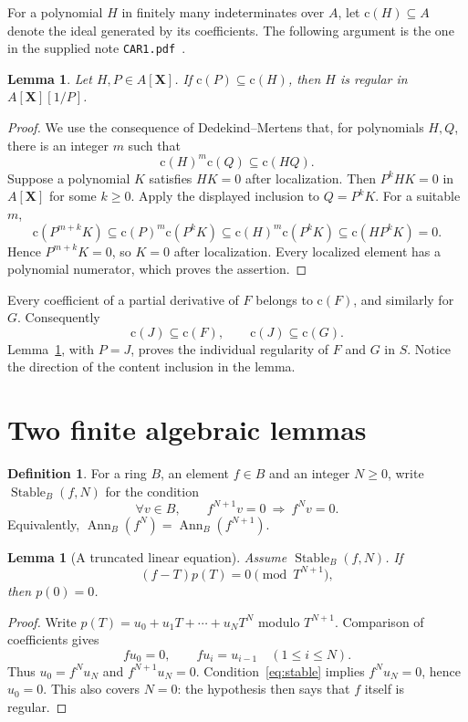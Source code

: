 \documentclass[11pt]{amsart}
\newtheorem{lemma}[theorem]{Lemma}
\theoremstyle{definition}
\newtheorem{definition}[theorem]{Definition}
\theoremstyle{remark}
\DeclareMathOperator{\Ann}{Ann}
\newcommand{\content}{\mathrm{c}}
\newcommand{\code}[1]{\texttt{#1}}
\begin{document}
For a polynomial $H$ in finitely many indeterminates over $A$, let
$\content(H)\subseteq A$ denote the ideal generated by its coefficients.
The following argument is the one in the supplied note
\code{CAR1.pdf}~\cite{CAR1}.

\begin{lemma}\label{lem:content}
Let $H,P\in A[\mathbf X]$. If
$\content(P)\subseteq\content(H)$, then $H$ is regular in
$A[\mathbf X][1/P]$.
\end{lemma}
\begin{proof}
We use the consequence of Dedekind--Mertens that, for polynomials
$H,Q$, there is an integer $m$ such that
\[
 \content(H)^m\content(Q)\subseteq\content(HQ).
\]
Suppose a polynomial $K$ satisfies $HK=0$ after localization.
Then $P^kHK=0$ in $A[\mathbf X]$ for some $k\geq0$.
Apply the displayed inclusion to $Q=P^kK$. For a suitable $m$,
\[
 \content(P^{m+k}K)
 \subseteq \content(P)^m\content(P^kK)
 \subseteq \content(H)^m\content(P^kK)
 \subseteq \content(HP^kK)=0.
\]
Hence $P^{m+k}K=0$, so $K=0$ after localization.
Every localized element has a polynomial numerator, which proves
the assertion.
\end{proof}

Every coefficient of a partial derivative of $F$ belongs to
$\content(F)$, and similarly for $G$. Consequently
\[
 \content(J)\subseteq\content(F),\qquad
 \content(J)\subseteq\content(G).
\]
Lemma~\ref{lem:content}, with $P=J$, proves the individual regularity
of $F$ and $G$ in $S$. Notice the direction of the content inclusion
in the lemma.

\section{Two finite algebraic lemmas}

\begin{definition}\label{def:stable}
For a ring $B$, an element $f\in B$ and an integer $N\geq0$, write
$\operatorname{Stable}_B(f,N)$ for the condition
\begin{equation}\label{eq:stable}
 \forall v\in B,\qquad f^{N+1}v=0\ \Longrightarrow\ f^Nv=0.
\end{equation}
Equivalently, $\Ann_B(f^N)=\Ann_B(f^{N+1})$.
\end{definition}

\begin{lemma}[A truncated linear equation]\label{lem:linear}
Assume $\operatorname{Stable}_B(f,N)$. If
\[
 (f-T)p(T)=0\pmod {T^{N+1}},
\]
then $p(0)=0$.
\end{lemma}
\begin{proof}
Write $p(T)=u_0+u_1T+\cdots+u_NT^N$ modulo $T^{N+1}$.
Comparison of coefficients gives
\[
 fu_0=0,\qquad fu_i=u_{i-1}\quad(1\leq i\leq N).
\]
Thus $u_0=f^Nu_N$ and $f^{N+1}u_N=0$.
Condition~\eqref{eq:stable} implies $f^Nu_N=0$, hence $u_0=0$.
This also covers $N=0$: the hypothesis then says that $f$ itself
is regular.
\end{proof}
\end{document}
